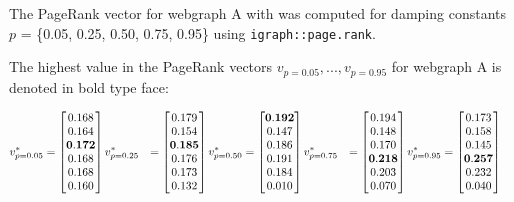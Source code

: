 \documentclass[]{article}
\begin{document}
The PageRank vector for webgraph A with was computed for damping
constants \(p\) = \{0.05, 0.25, 0.50, 0.75, 0.95\} using
\texttt{igraph::page.rank}.

The highest value in the PageRank vectors
\(v_{p=0.05}, ... , v_{p=0.95}\) for webgraph A is denoted in bold type
face:

\begin{align}
v_{p=0.05}^{*} &= \begin{bmatrix}
   0.168 \\
   0.164 \\
   \bf{0.172} \\
   0.168 \\
   0.168 \\
   0.160 
 \end{bmatrix}
v_{p=0.25}^{*} &= \begin{bmatrix}
   0.179 \\
   0.154 \\
   \bf{0.185} \\
   0.176 \\
   0.173 \\
   0.132
 \end{bmatrix}
v_{p=0.50}^{*} &= \begin{bmatrix}
   \bf{0.192} \\
   0.147 \\
   0.186 \\
   0.191 \\
   0.184 \\
   0.010 
 \end{bmatrix}
v_{p=0.75}^{*} &= \begin{bmatrix}
   0.194 \\
   0.148 \\
   0.170 \\
   \bf{0.218} \\
   0.203 \\
   0.070 \\
 \end{bmatrix}
v_{p=0.95}^{*} &= \begin{bmatrix}
   0.173 \\
   0.158 \\
   0.145 \\
   \bf{0.257} \\
   0.232 \\
   0.040 \\
 \end{bmatrix}
\end{align}
\end{document}
